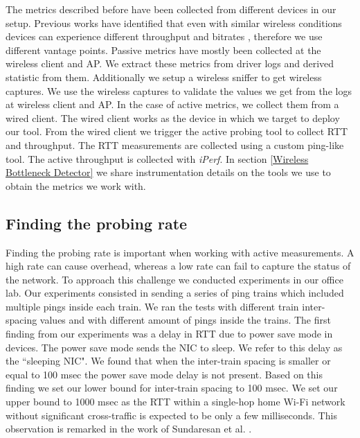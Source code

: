 The metrics described before have been collected from different devices in our setup. Previous works have identified that even with similar wireless conditions devices can experience different throughput and bitrates \cite{measuring_user_traffic}, therefore we use different vantage points. Passive metrics have mostly been collected at the wireless client and AP. We extract these metrics from driver logs and derived statistic from them. Additionally we setup a wireless sniffer to get wireless captures. We use the wireless captures to validate the values we get from the logs at wireless client and AP. In the case of active metrics, we collect them from a wired client. The wired client works as the device in which we target to deploy our tool. From the wired client we trigger the active probing tool to collect RTT and throughput. The RTT measurements are collected using a custom ping-like tool. The active throughput is collected with \emph{iPerf}. In section \ref{Wireless Bottleneck Detector} we share instrumentation details on the tools we use to obtain the metrics we work with.

\subsection{Finding the probing rate}\label{probing_rate}

Finding the probing rate is important when working with active measurements. A high rate can cause overhead, whereas a low rate can fail to capture the status of the network. To approach this challenge we conducted experiments in our office lab. Our experiments consisted in sending a series of ping trains which included multiple pings inside each train. We ran the tests with different train inter-spacing values and with different amount of pings inside the trains. The first finding from our experiments was a delay in RTT due to power save mode in devices. The power save mode sends the NIC to sleep. We refer to this delay as the ``sleeping NIC". We found that when the inter-train spacing is smaller or equal to 100 msec the power save mode delay is not present. Based on this finding we set our lower bound for inter-train spacing to 100 msec. We set our upper bound to 1000 msec as the RTT within a single-hop home Wi-Fi  network without significant cross-traffic is expected to be only a few milliseconds. This observation is remarked in the work of Sundaresan et al. \cite{homeoraccesslink}.

